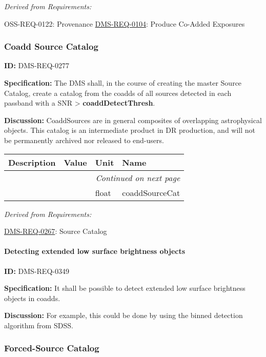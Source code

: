 \documentclass[SE,toc,lsstdraft]{lsstdoc}
\makeatletter
\newcommand{\paramname}[1]{\hspace{0pt}#1}
\newcommand{\unitname}[1]{\hspace{0pt}#1}
\newenvironment{parameters}[0]{%
\setlength\LTleft{0pt}
\setlength\LTright{\fill}
\begin{small}
\begin{longtable}[]{|p{0.5\textwidth}|l|p{0.6in}|p{1.74in}@{}|}

\hline \textbf{Description} & \textbf{Value} & \textbf{Unit} & \textbf{Name} \\ \hline
\endhead

\hline \multicolumn{4}{r}{\emph{Continued on next page}} \\
\endfoot

\hline\hline
\endlastfoot
}{%
\hline
\end{longtable}
\end{small}
}
\makeatother
\begin{document}
\emph{Derived from Requirements:}

OSS-REQ-0122:
Provenance \newline
\hyperref[DMS-REQ-0104]{DMS-REQ-0104}:
Produce Co-Added Exposures \newline


\subsubsection{Coadd Source Catalog}

\label{DMS-REQ-0277}
\textbf{ID:} DMS-REQ-0277

\textbf{Specification:} The DMS shall, in the course of creating the master Source Catalog, create a catalog from the coadds of all sources detected in each passband with a SNR > \textbf{coaddDetectThresh}.

\textbf{Discussion: }CoaddSources are in general composites of overlapping astrophysical objects. This catalog is an intermediate product in DR production, and will not be permanently archived nor released to end-users.



\begin{parameters}

&

&
\unitname{%
float
}
&
\paramname{%
coaddSourceCat
} \\\hline
\end{parameters}




\emph{Derived from Requirements:}

\hyperref[DMS-REQ-0267]{DMS-REQ-0267}:
Source Catalog \newline


\paragraph{Detecting extended  low surface brightness objects}\hfill  %

\label{DMS-REQ-0349}
\textbf{ID:} DMS-REQ-0349

\textbf{Specification: }It shall be possible to detect extended low surface brightness objects in coadds.

\textbf{Discussion: }For example, this could be done by using the binned detection algorithm from SDSS.




\subsubsection{Forced-Source Catalog}
\end{document}

